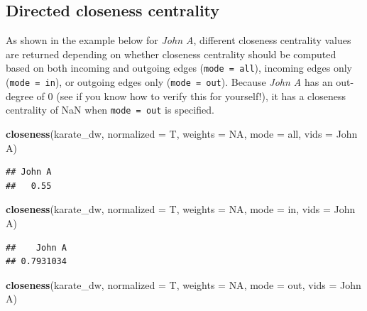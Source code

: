 \documentclass[
]{book}
\newenvironment{Shaded}{\begin{snugshade}}{\end{snugshade}}
\newcommand{\AttributeTok}[1]{\textcolor[rgb]{0.13,0.29,0.53}{#1}}
\newcommand{\ConstantTok}[1]{\textcolor[rgb]{0.56,0.35,0.01}{#1}}
\newcommand{\FunctionTok}[1]{\textcolor[rgb]{0.13,0.29,0.53}{\textbf{#1}}}
\newcommand{\NormalTok}[1]{#1}
\newcommand{\StringTok}[1]{\textcolor[rgb]{0.31,0.60,0.02}{#1}}
\begin{document}
\subsection{Directed closeness centrality}\label{directed-closeness-centrality}

As shown in the example below for \emph{John A}, different closeness centrality values are returned depending on whether closeness centrality should be computed based on both incoming and outgoing edges (\texttt{mode\ =\ \textquotesingle{}all\textquotesingle{}}), incoming edges only (\texttt{mode\ =\ \textquotesingle{}in\textquotesingle{}}), or outgoing edges only (\texttt{mode\ =\ \textquotesingle{}out\textquotesingle{}}). Because \emph{John A} has an out-degree of 0 (see if you know how to verify this for yourself!), it has a closeness centrality of NaN when \texttt{mode\ =\ \textquotesingle{}out\textquotesingle{}} is specified.

\begin{Shaded}
\begin{Highlighting}[]
\FunctionTok{closeness}\NormalTok{(karate\_dw, }\AttributeTok{normalized =}\NormalTok{ T, }\AttributeTok{weights =} \ConstantTok{NA}\NormalTok{, }\AttributeTok{mode =} \StringTok{\textquotesingle{}all\textquotesingle{}}\NormalTok{, }\AttributeTok{vids =} \StringTok{\textquotesingle{}John A\textquotesingle{}}\NormalTok{)}
\end{Highlighting}
\end{Shaded}

\begin{verbatim}
## John A 
##   0.55
\end{verbatim}

\begin{Shaded}
\begin{Highlighting}[]
\FunctionTok{closeness}\NormalTok{(karate\_dw, }\AttributeTok{normalized =}\NormalTok{ T, }\AttributeTok{weights =} \ConstantTok{NA}\NormalTok{, }\AttributeTok{mode =} \StringTok{\textquotesingle{}in\textquotesingle{}}\NormalTok{, }\AttributeTok{vids =} \StringTok{\textquotesingle{}John A\textquotesingle{}}\NormalTok{)}
\end{Highlighting}
\end{Shaded}

\begin{verbatim}
##    John A 
## 0.7931034
\end{verbatim}

\begin{Shaded}
\begin{Highlighting}[]
\FunctionTok{closeness}\NormalTok{(karate\_dw, }\AttributeTok{normalized =}\NormalTok{ T, }\AttributeTok{weights =} \ConstantTok{NA}\NormalTok{, }\AttributeTok{mode =} \StringTok{\textquotesingle{}out\textquotesingle{}}\NormalTok{, }\AttributeTok{vids =} \StringTok{\textquotesingle{}John A\textquotesingle{}}\NormalTok{)}
\end{Highlighting}
\end{Shaded}
\end{document}
